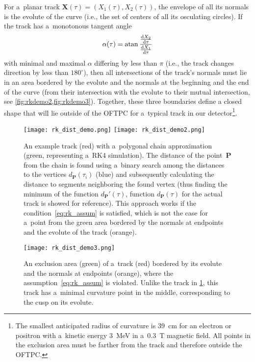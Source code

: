 		For a~planar track $\mathbf{X}(\tau) = \left(X_1(\tau),X_2(\tau)\right)$, the envelope of all its normals is the evolute of the curve (i.e., the set of centers of all its osculating circles). If the track has a~monotonous tangent angle
			\begin{equation}
				\alpha(\tau) = \atan{\frac{\dv{X_2}{\tau}}{\dv{X_1}{\tau}}}
			\end{equation}
		with minimal and maximal $\alpha$ differing by less than $\pi$ (i.e., the track changes direction by less than $180^\circ$), then all intersections of the track's normals must lie in an area bordered by the evolute and the normals at the beginning and the end of the curve (from their intersection with the evolute to their mutual intersection, see \cref{fig:rkdemo2,fig:rkdemo3}). Together, these three boundaries define a closed shape that will lie outside of the \ac{OFTPC} for a~typical track in our detector\footnote{The smallest anticipated radius of curvature is \qty{39}{\cm} for an electron or positron with a~kinetic energy \qty{3}{\MeV} in a~\qty{0.3}{\tesla} magnetic field. All points in the exclusion area must be farther from the track and therefore outside the \ac{OFTPC}.}.
			\begin{figure}
				\centering
				\texttt{[image: rk\_dist\_demo.png]}
				\hfill
				\texttt{[image: rk\_dist\_demo2.png]}
				\caption{An example track (red) with a~polygonal chain approximation (green, representing a~\ac{RK4} simulation). The distance of the point~$\mathbf{P}$ from the chain is found using a~binary search among the distances to the vertices $d_\mathbf{P}(\tau_i)$ (blue) and subsequently calculating the distance to segments neighboring the found vertex (thus finding the minimum of the function $d_\mathbf{P}'(\tau)$, function $d_\mathbf{P}(\tau)$ for the actual track is showed for reference). This approach works if the condition~\ref{eq:rk_assum} is satisfied, which is not the case for a~point from the green area bordered by the normals at endpoints and the evolute of the track (orange).}
				\label{fig:rkdemo2}
			\end{figure}
			\begin{figure}
				\centering
				\texttt{[image: rk\_dist\_demo3.png]}
				\caption{An exclusion area (green) of a~track (red) bordered by its evolute and the normals at endpoints (orange), where the assumption~\ref{eq:rk_assum} is violated. Unlike the track in \cref{fig:rkdemo2}, this track has a~minimal curvature point in the middle, corresponding to the cusp on its evolute.}
				\label{fig:rkdemo3}
			\end{figure}
		
